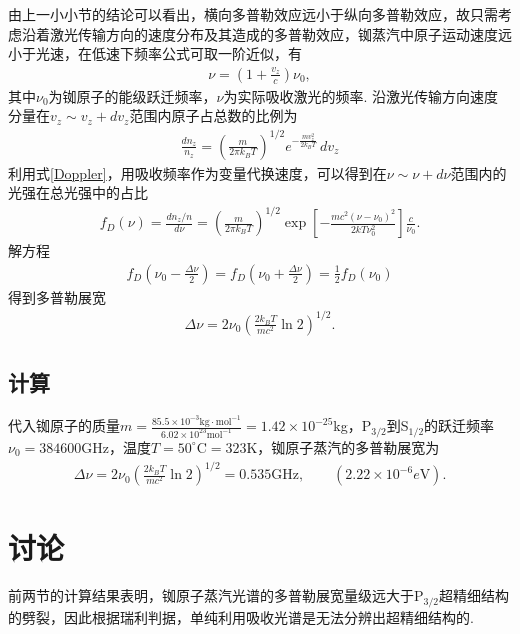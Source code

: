 \documentclass{assignment}
\begin{document}
由上一小小节的结论可以看出，横向多普勒效应远小于纵向多普勒效应，故只需考虑沿着激光传输方向的速度分布及其造成的多普勒效应，铷蒸汽中原子运动速度远小于光速，在低速下频率公式可取一阶近似，有
\begin{align}
    \label{Doppler}
    \nu=\left(1+\frac{v_z}{c}\right)\nu_0,
\end{align}
其中$\nu_0$为铷原子的能级跃迁频率，$\nu$为实际吸收激光的频率. 沿激光传输方向速度分量在$v_z\sim v_z+dv_z$范围内原子占总数的比例为
\begin{align}
    \frac{dn_z}{n_z}=\left(\frac{m}{2\pi k_BT}\right)^{1/2}e^{-\frac{mv_z^2}{2k_BT}}\,dv_z
\end{align}
利用式\eqref{Doppler}，用吸收频率作为变量代换速度，可以得到在$\nu\sim\nu+d\nu$范围内的光强在总光强中的占比
\begin{align}
    f_D(\nu)=\frac{dn_z/n}{d\nu}=\left(\frac{m}{2\pi k_BT}\right)^{1/2}\exp\left[-\frac{mc^2(\nu-\nu_0)^2}{2kT\nu_0^2}\right]\frac{c}{\nu_0}.
\end{align}
解方程
\begin{align}
    f_D\left(\nu_0-\frac{\Delta\nu}{2}\right)=f_D\left(\nu_0+\frac{\Delta\nu}{2}\right)=\frac{1}{2}f_D(\nu_0)
\end{align}
得到多普勒展宽
\begin{align}
    \Delta\nu=2\nu_0\left(\frac{2k_BT}{mc^2}\ln 2\right)^{1/2}.
\end{align}

\subsection{计算}
代入铷原子的质量$m=\frac{85.5\times 10^{-3}\text{kg}\cdot\text{mol}^{-1}}{6.02\times 10^{23}\text{mol}^{-1}}=1.42\times 10^{-25}$kg，P$_{3/2}$到S$_{1/2}$的跃迁频率$\nu_0=384600$GHz，温度$T=50^{\circ}\text{C}=323$K，铷原子蒸汽的多普勒展宽为
\begin{align}
    \Delta\nu=2\nu_0\left(\frac{2k_BT}{mc^2}\ln 2\right)^{1/2}=0.535\text{GHz},\qquad(2.22\times 10^{-6}e\text{V}).
\end{align}

\section{讨论}
前两节的计算结果表明，铷原子蒸汽光谱的多普勒展宽量级远大于P$_{3/2}$超精细结构的劈裂，因此根据瑞利判据，单纯利用吸收光谱是无法分辨出超精细结构的.
\end{document}
